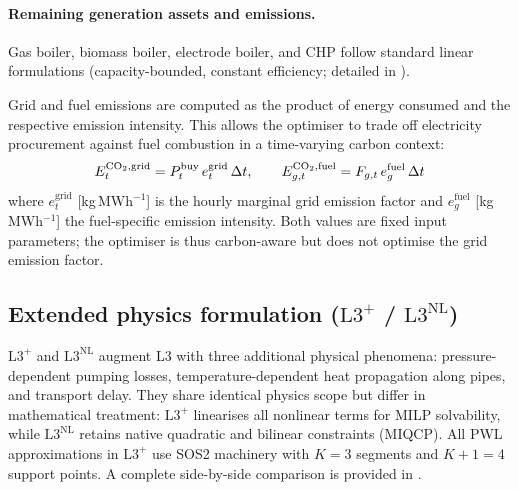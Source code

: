 \documentclass[a4paper,fleqn]{cas-dc}
\newcommand{\Lplus}{\mathrm{L3}^{+}}
\newcommand{\Lnl}{\mathrm{L3}^{\mathrm{NL}}}
\begin{document}
\paragraph{Remaining generation assets and emissions.}
Gas boiler, biomass boiler, electrode boiler, and CHP follow
standard linear formulations (capacity-bounded, constant
efficiency; detailed in ).

Grid and fuel emissions are computed as the product of energy
consumed and the respective emission intensity. This allows the
optimiser to trade off electricity procurement against fuel
combustion in a time-varying carbon context:
%
\begin{equation}
  E_t^{\ce{CO2},\mathrm{grid}} =
    P_t^{\mathrm{buy}}\, e_t^{\mathrm{grid}}\, \Delta t,
  \qquad
  E_{g,t}^{\ce{CO2},\mathrm{fuel}} =
    F_{g,t}\, e_g^{\mathrm{fuel}}\, \Delta t
  \label{eq:emissions}
\end{equation}
%
where $e_t^{\mathrm{grid}}$ [kg\,MWh$^{-1}$] is the hourly
marginal grid emission factor and $e_g^{\mathrm{fuel}}$
[kg\,MWh$^{-1}$] the fuel-specific emission intensity.
Both values are fixed input parameters; the optimiser is thus
carbon-aware but does not optimise the grid emission factor.

\subsection{Extended physics formulation ($\Lplus$ / $\Lnl$)}
\label{sec:extended}

$\Lplus$ and $\Lnl$ augment L3 with three additional physical
phenomena: pressure-dependent pumping losses, temperature-dependent
heat propagation along pipes, and transport delay. They share
identical physics scope but differ in mathematical treatment:
$\Lplus$ linearises all nonlinear terms for MILP solvability, while
$\Lnl$ retains native quadratic and bilinear constraints (MIQCP).
All PWL approximations in $\Lplus$ use SOS2 machinery 
with $K{=}3$ segments and $K{+}1=4$ support points. A complete side-by-side
comparison is provided in .
\end{document}
